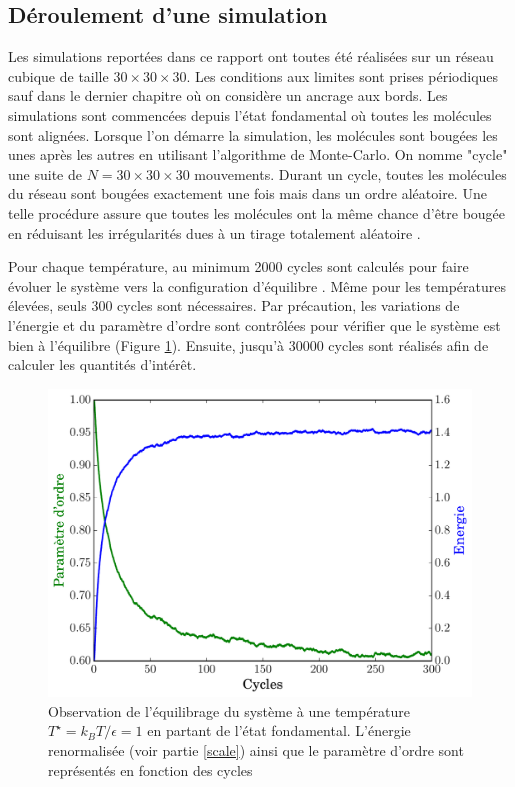 \documentclass[11pt,a4paper]{article}
\numberwithin{equation}{section}
\begin{document}
\subsection{Déroulement d'une simulation} 
Les simulations reportées dans ce rapport ont toutes été réalisées sur un réseau cubique de taille $30\times 30\times 30$. Les conditions aux limites sont prises périodiques sauf dans le dernier chapitre où on considère un ancrage aux bords. Les simulations sont commencées depuis l'état fondamental où toutes les molécules sont alignées. Lorsque l'on démarre la simulation, les molécules sont bougées les unes après les autres en utilisant l'algorithme de Monte-Carlo. On nomme "cycle" une suite de $N = 30\times 30\times 30$ mouvements. Durant un cycle, toutes les molécules du réseau sont bougées exactement une fois mais dans un ordre aléatoire. Une telle procédure assure que toutes les molécules ont la même chance d'être bougée en réduisant les irrégularités dues à un tirage totalement aléatoire \cite{fabbri}. 
\medskip

Pour chaque température, au minimum 2000 cycles sont calculés pour faire évoluer le système vers la configuration d'équilibre . Même pour les températures élevées, seuls 300 cycles sont nécessaires. Par précaution, les variations de l'énergie et du paramètre d'ordre sont contrôlées pour vérifier que le système est bien à l'équilibre (Figure \ref{equilibrage}). Ensuite, jusqu'à 30000 cycles sont réalisés afin de calculer les quantités d'intérêt.

\begin{figure}[h!]
    \centering	    
	\includegraphics[scale=0.6]{figures/equilibrage.pdf}
    \caption{Observation de l'équilibrage du système à une température $T^\star = k_B T/\epsilon = 1$ en partant de l'état fondamental. L'énergie renormalisée (voir partie \ref{scale}) ainsi que le paramètre d'ordre sont représentés en fonction des cycles}
    	\label{equilibrage} 
\end{figure}
\end{document}
